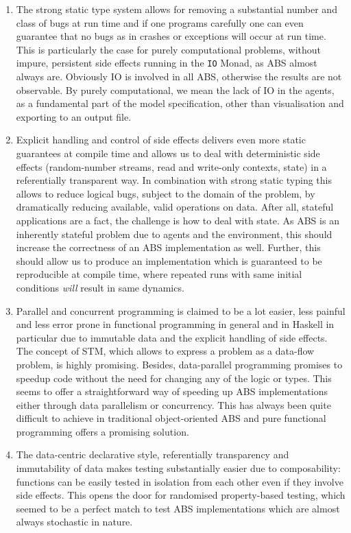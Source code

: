 \begin{enumerate}
	\item The strong static type system allows for removing a substantial number and class of bugs at run time and if one programs carefully one can even guarantee that no bugs as in crashes or exceptions will occur at run time. This is particularly the case for purely computational problems, without impure, persistent side effects running in the \texttt{IO} Monad, as ABS almost always are. Obviously IO is involved in all ABS, otherwise the results are not observable. By purely computational, we mean the lack of IO in the agents, as a fundamental part of the model specification, other than visualisation and exporting to an output file.
	
	\item Explicit handling and control of side effects delivers even more static guarantees at compile time and allows us to deal with deterministic side effects (random-number streams, read and write-only contexts, state) in a referentially transparent way. In combination with strong static typing this allows to reduce logical bugs, subject to the domain of the problem, by dramatically reducing available, valid operations on data. After all, stateful applications are a fact, the challenge is how to deal with state. As ABS is an inherently stateful problem due to agents and the environment, this should increase the correctness of an ABS implementation as well. Further, this should allow us to produce an implementation which is guaranteed to be reproducible at compile time, where repeated runs with same initial conditions \textit{will} result in same dynamics.
	
	\item Parallel and concurrent programming is claimed to be a lot easier, less painful and less error prone in functional programming in general and in Haskell in particular due to immutable data and the explicit handling of side effects. The concept of STM, which allows to express a problem as a data-flow problem, is highly promising. Besides, data-parallel programming promises to speedup code without the need for changing any of the logic or types. This seems to offer a straightforward way of speeding up ABS implementations either through data parallelism or concurrency. This has always been quite difficult to achieve in traditional object-oriented ABS and pure functional programming offers a promising solution.
	
	\item The data-centric declarative style, referentially transparency and immutability of data makes testing substantially easier due to composability: functions can be easily tested in isolation from each other even if they involve side effects. This opens the door for randomised property-based testing, which seemed to be a perfect match to test ABS implementations which are almost always stochastic in nature.
\end{enumerate}

